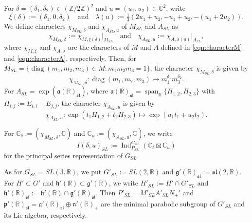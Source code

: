 \documentclass[a4paper,11pt,reqno]{amsart}
\newcommand{\fraka}{\mathfrak{a}}
\newcommand{\frakg}{\mathfrak{g}}
\newcommand{\frakh}{\mathfrak{h}}
\newcommand{\frakn}{\mathfrak{n}}
\newcommand{\frakp}{\mathfrak{p}}
\newcommand{\0}{{\bf 0}}
\newcommand{\Z}{\mathbb{Z}}
\newcommand{\R}{\mathbb{R}}
\newcommand{\C}{\mathbb{C}}
\newcommand{\1}{{\bf 1}}
\DeclareMathOperator{\Ind}{Ind}
\DeclareMathOperator{\Span}{span}
\DeclareMathOperator{\diag}{diag}
\newcommand{\fraksl}{{\mathfrak{sl}}}
\theoremstyle{plain}
\theoremstyle{definition}
\numberwithin{equation}{section}
\theoremstyle{definition}
\begin{document}
For $\delta=(\delta_1,\delta_2) \in (\Z/2\Z)^2$ and $u=(u_1,u_2) \in \C^2$, 
write
\begin{equation}\label{eqn:delta_u}
\xi(\delta)
:=(\delta_1, 0, \delta_2)
\quad
\text{and}
\quad
\lambda(u)
:= \tfrac{1}{3}(2u_1+u_2,-u_1+u_2,-(u_1+2u_2)).
\end{equation}
We define characters $\chi_{M_{SL},\delta}$ and $\chi_{A_{SL},u}$
of $M_{SL}$ and $A_{SL}$ as 
\begin{equation*}
\chi_{M_{SL},\delta}:=\chi_{M,\xi(\delta)}\vert_{M_{SL}}
\quad
\text{and}
\quad
\chi_{A_{SL},u}:=\chi_{A,\lambda(u)}\vert_{A_{SL}},
\end{equation*}
where 
$\chi_{M,\xi}$ and $\chi_{A,\lambda}$ are 
the characters of $M$ and $A$ defined in 
\eqref{eqn:characterM}
and
\eqref{eqn:characterA}, respectively.
Then, for $M_{SL}=\{\diag(m_1,m_2, m_3) \in M: m_1m_2m_3=1\}$,
the character $\chi_{M_{SL},\delta}$ is given by
\begin{equation}\label{eqn:charSLM}
\chi_{M_{SL},\delta}\colon 
\diag(m_1, m_2, m_3)
\mapsto m_1^{\delta_1}m_3^{\delta_2}.
\end{equation}
For $A_{SL}=\exp(\fraka(\R)_{\fraksl})$, where 
$\fraka(\R)_{\fraksl}=\Span_\R\{H_{1,2}, H_{2,3}\}$ 
with $H_{i,j}:=E_{i,i}-E_{j,j}$, the character $\chi_{A_{SL},u}$ is given by
\begin{equation}\label{eqn:charSLA}
\chi_{A_{SL},u}\colon 
\exp(t_1H_{1,2} + t_2H_{2,3})
\mapsto
\exp(u_1t_1 + u_2t_2).
\end{equation}

For
$\C_\delta:=(\chi_{M_{SL},\delta},\C)$
and
$\C_u:=(\chi_{A_{SL},u},\C)$,  we write
\begin{equation*}
I(\delta, u)_{SL}:=\Ind_{P_{SL}}^{G_{SL}}(\C_{\delta}\boxtimes \C_u)
\end{equation*}
for the principal series representation of $G_{SL}$.

As for $G_{SL}=SL(3,\R)$, we put  $G'_{SL}:= SL(2,\R)$ and 
$\frakg'(\R)_{\fraksl}:=\mathfrak{sl}(2,\R)$.
For $H' \subset G'$ and $\frakh'(\R) \subset \frakg'(\R)$,
we write $H'_{SL}:=H' \cap G'_{SL}$ and $\frakh'(\R)_{\fraksl}:=\frakh'(\R) \cap \frakg'(\R)_{\fraksl}$.
Then $P'_{SL}=M'_{SL}A'_{SL}N_+'$ and $\frakp'(\R)_{\fraksl} =\fraka'(\R)_{\fraksl} \oplus \frakn'(\R)_{+}$ are the minimal parabolic subgroup of $G'_{SL}$ and its Lie algebra, respectively.
\end{document}
